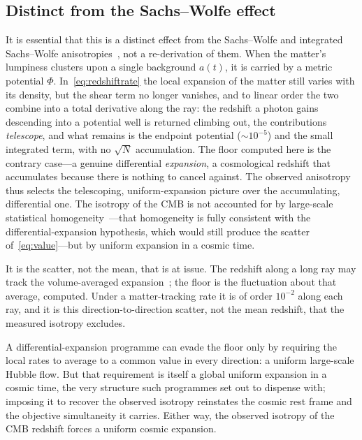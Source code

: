 \documentclass[11pt,a4paper]{article}
\begin{document}
\subsection{Distinct from the Sachs--Wolfe effect}\label{sec:sw}

It is essential that this is a distinct effect from the Sachs--Wolfe and integrated Sachs--Wolfe anisotropies~\cite{Sachs1967, Rees1968}, not a re-derivation of them. When the matter's lumpiness clusters upon a single background $a(t)$, it is carried by a metric potential $\Phi$. In~\eqref{eq:redshiftrate} the local expansion of the matter still varies with its density, but the shear term no longer vanishes, and to linear order the two combine into a total derivative along the ray: the redshift a photon gains descending into a potential well is returned climbing out, the contributions \emph{telescope}, and what remains is the endpoint potential ($\sim\!10^{-5}$) and the small integrated term, with no $\sqrt{N}$ accumulation. The floor computed here is the contrary case---a genuine differential \emph{expansion}, a cosmological redshift that accumulates because there is nothing to cancel against. The observed anisotropy thus selects the telescoping, uniform-expansion picture over the accumulating, differential one. The isotropy of the CMB is not accounted for by large-scale statistical homogeneity~\cite{Scrimgeour2012}---that homogeneity is fully consistent with the differential-expansion hypothesis, which would still produce the scatter of~\eqref{eq:value}---but by uniform expansion in a cosmic time.

It is the scatter, not the mean, that is at issue. The redshift along a long ray may track the volume-averaged expansion~\cite{Rasanen2009}; the floor is the fluctuation about that average, computed. Under a matter-tracking rate it is of order $10^{-2}$ along each ray, and it is this direction-to-direction scatter, not the mean redshift, that the measured isotropy excludes.

A differential-expansion programme can evade the floor only by requiring the local rates to average to a common value in every direction: a uniform large-scale Hubble flow. But that requirement is itself a global uniform expansion in a cosmic time, the very structure such programmes set out to dispense with; imposing it to recover the observed isotropy reinstates the cosmic rest frame and the objective simultaneity it carries. Either way, the observed isotropy of the CMB redshift forces a uniform cosmic expansion.
\end{document}

